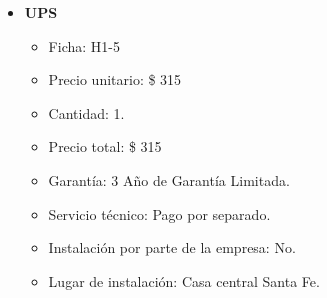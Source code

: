 \begin{itemize}
  \item \textbf{UPS}
    \begin{itemize}
      \item Ficha: H1-5
      \item Precio unitario: \$ 315
      \item Cantidad: 1.
      \item Precio total: \$ 315
      \item Garantía: 3 Año de Garantía Limitada.
      \item Servicio técnico: Pago por separado.
      \item Instalación por parte de la empresa: No.
      \item Lugar de instalación: Casa central Santa Fe.
    \end{itemize}

\end{itemize}

